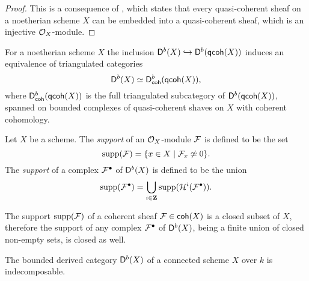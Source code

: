 \begin{proof}
    This is a consequence of \cite[\S II, Theorem 7.18]{Hartshorne1966},  which states that every quasi-coherent sheaf on a noetherian scheme $X$ can be embedded into a quasi-coherent sheaf, which is an injective ${\mathcal{O}_{X}}$-module. 
\end{proof}

\begin{proposition}
    \label{Db(X) is bounded derived of quasi-coherent with coherent cohomology}
    For a noetherian scheme $X$ the inclusion $\mathsf{D}^b(X) \hookrightarrow \mathsf{D}^b(\mathsf{qcoh}(X))$ induces an equivalence of triangulated categories
    \[
        \mathsf{D}^b(X) \simeq \mathsf{D}^b_{\mathsf{coh}}(\mathsf{qcoh}(X)),
    \]
    where $\mathsf{D}^b_{\mathsf{coh}}(\mathsf{qcoh}(X))$ is the full triangulated subcategory of $\mathsf{D}^b(\mathsf{qcoh}(X))$, spanned on bounded complexes of quasi-coherent shaves on $X$ with coherent cohomology.
\end{proposition}

\begin{definition}
    \label{Definition of support}
    Let $X$ be a scheme. The \emph{support} of an ${\mathcal{O}_{X}}$-module $\mathcal F$ is defined to be the set
    \[
        \operatorname{supp}(\mathcal F) = \{x \in X \mid \mathcal F_x \not\simeq 0 \}.
    \] 
    The \emph{support} of a complex $\mathcal F^\bullet$ of $\mathsf{D}^b(X)$ is defined to be the union
    \[
        \operatorname{supp}(\mathcal F^\bullet) = \bigcup_{i \in \mathbf Z} \operatorname{supp}(\mathcal H^i(\mathcal F^\bullet)).
    \]
\end{definition}

\begin{remark}
    \label{supports closed}
    The support $\operatorname{supp}(\mathcal F)$ of a coherent sheaf $\mathcal F \in \mathsf{coh}(X)$ is a closed subset of $X$, therefore the support of any complex $\mathcal F^\bullet$ of $\mathsf{D}^b(X)$, being a finite union of closed non-empty sets, is closed as well.
\end{remark}

\begin{theorem}
    \label{Db(X) indecomposable for X connected}
    The bounded derived category $\mathsf{D}^b(X)$ of a connected scheme $X$ over $k$ is indecomposable.
\end{theorem}

